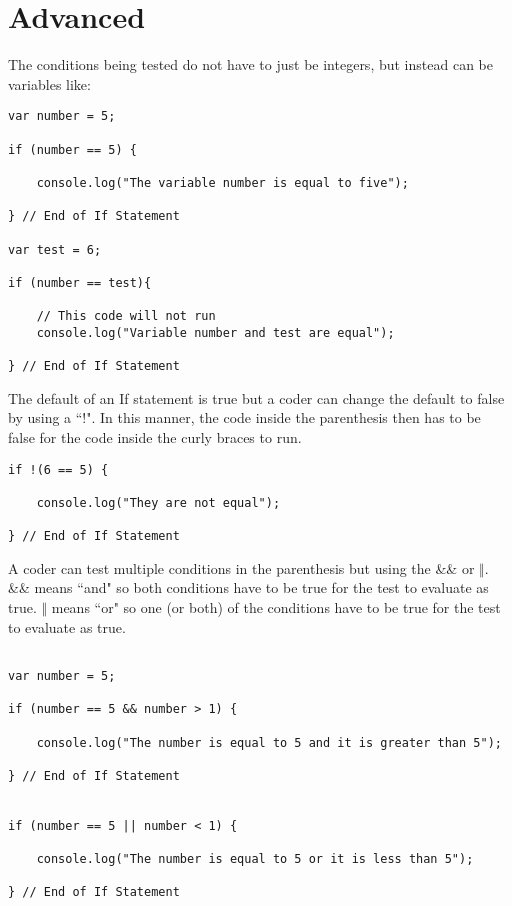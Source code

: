 \documentclass[12pt, letterpaper]{article}
\begin{document}
\section*{Advanced}

The conditions being tested do not have to just be integers, but instead can be variables like: \\

\begin{lstlisting}
var number = 5;

if (number == 5) {

	console.log("The variable number is equal to five");

} // End of If Statement

var test = 6;

if (number == test){

	// This code will not run
	console.log("Variable number and test are equal");

} // End of If Statement
\end{lstlisting}
The default of an If statement is true but a coder can change the default to false by using a ``!". In this manner, the code inside the parenthesis then has to be false for the code inside the curly braces to run. \\

\begin{lstlisting}
if !(6 == 5) {

	console.log("They are not equal");

} // End of If Statement
\end{lstlisting}
A coder can test multiple conditions in the parenthesis but using the \&\& or  $\Vert$. \&\& means ``and" so both conditions have to be true for the test to evaluate as true. $\Vert$ means ``or" so one (or both) of the conditions have to be true for the test to evaluate as true.

\begin{lstlisting}

var number = 5;

if (number == 5 && number > 1) {

	console.log("The number is equal to 5 and it is greater than 5");

} // End of If Statement


if (number == 5 || number < 1) {

	console.log("The number is equal to 5 or it is less than 5");

} // End of If Statement

\end{lstlisting}
\end{document}
